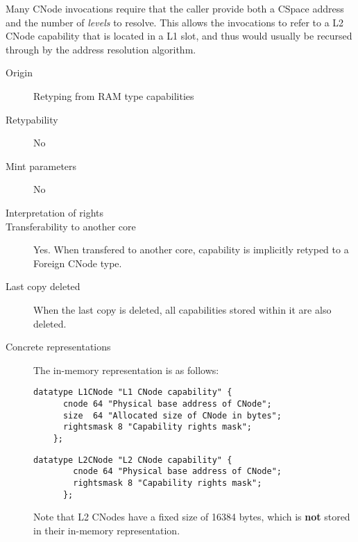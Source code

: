 Many CNode invocations require that the caller provide both a CSpace
address and the number of \emph{levels} to resolve. This allows the
invocations to refer to a L2 CNode capability that is located in a L1 slot,
and thus would usually be recursed through by the address resolution
algorithm.

\begin{description}
\item[Origin] Retyping from RAM type capabilities

\item[Retypability] No

\item[Mint parameters] No

\item[Interpretation of rights] 

\item[Transferability to another core] Yes.  When transfered to
  another core, capability is implicitly retyped to a Foreign CNode
  type.

\item[Last copy deleted] When the last copy is deleted, all
  capabilities stored within it are also deleted.

\item[Concrete representations] The in-memory representation is as follows:
    
  \begin{lstlisting}[language=Mackerel]
    datatype L1CNode "L1 CNode capability" {
      cnode 64 "Physical base address of CNode";
      size  64 "Allocated size of CNode in bytes";
      rightsmask 8 "Capability rights mask";
    };
    \end{lstlisting}

    \begin{lstlisting}[language=Mackerel]
      datatype L2CNode "L2 CNode capability" {
        cnode 64 "Physical base address of CNode";
        rightsmask 8 "Capability rights mask";
      };
    \end{lstlisting}

    Note that L2 CNodes have a fixed size of 16384 bytes, which is
    \textbf{not} stored in their in-memory representation.
\end{description}

